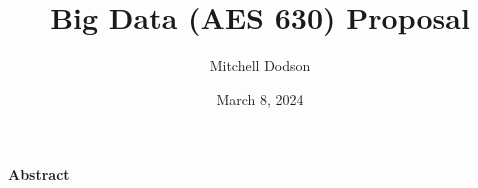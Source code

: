 \documentclass[11pt]{article}
\title{Big Data (AES 630) Proposal}
\author{Mitchell Dodson}
\date{March 8, 2024}
\begin{document}
\maketitle

\newpage

\noindent
{\Large\textbf{Abstract}}
\end{document}
